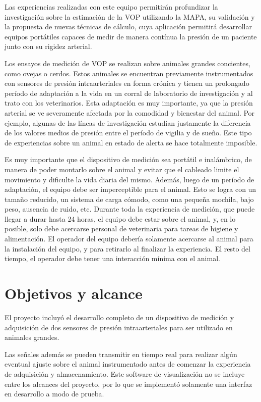 Las experiencias realizadas con este equipo permitirán profundizar la investigación sobre la estimación de la VOP utilizando la MAPA, su validación y la propuesta de nuevas técnicas de cálculo, cuya aplicación permitirá desarrollar equipos portátiles capaces de medir de manera contínua la presión de un paciente junto con su rigidez arterial.

Los ensayos de medición de VOP se realizan sobre animales grandes concientes, como ovejas o cerdos. Estos animales se encuentran previamente instrumentados con sensores de presión intraarteriales en forma crónica y tienen un prolongado período de adaptación a la vida en un corral de laboratorio de investigación y al trato con los veterinarios. Esta adaptación es muy importante, ya que la presión arterial se ve severamente afectada por la comodidad y bienestar del animal. Por ejemplo, algunas de las líneas de investigación estudian justamente la diferencia de los valores medios de presión entre el período de vigilia y de sueño. Este tipo de experiencias sobre un animal en estado de alerta se hace totalmente imposible.

Es muy importante que el dispositivo de medición sea portátil e inalámbrico, de manera de poder montarlo sobre el animal y evitar que el cableado limite el movimiento y dificulte la vida diaria del mismo. Además, luego de un período de adaptación, el equipo debe ser imperceptible para el animal. Esto se logra con un tamaño reducido, un sistema de carga cómodo, como una pequeña mochila, bajo peso, ausencia de ruido, etc. Durante toda la experiencia de medición, que puede llegar a durar hasta 24 horas, el equipo debe estar sobre el animal, y, en lo posible, solo debe acercarse personal de veterinaria para tareas de higiene y alimentación. El operador del equipo debería solamente acercarse al animal para la instalación del equipo, y para retirarlo al finalizar la experiencia. El resto del tiempo, el operador debe tener una interacción mínima con el animal.


\section{Objetivos y alcance}

El proyecto incluyó el desarrollo completo de un dispositivo de medición y adquisición de dos sensores de presión intraarteriales para ser utilizado en animales grandes.

Las señales además se pueden transmitir en tiempo real para realizar algún eventual ajuste sobre el animal instrumentado antes de comenzar la experiencia de adquisición y almacenamiento. Este software de visualización no se incluye entre los alcances del proyecto, por lo que se implementó solamente una interfaz en desarrollo a modo de prueba. 

